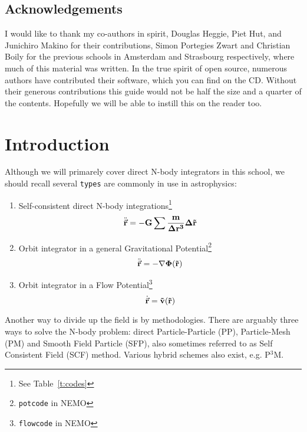 \section*{Acknowledgements}

I would like to thank my co-authors in spirit, 
Douglas Heggie, Piet Hut, and Junichiro Makino for their contributions, 
Simon Portegies Zwart and Christian Boily for the previous schools in Amsterdam 
and Strasbourg respectively, where much of this material was written.
In the true spirit of open source, 
numerous authors have contributed their software, which you can find on
the CD. Without their generous contributions this guide would not be
half the size and a quarter of the contents.
Hopefully we will be able to instill this on the reader too.



\chapter                {Introduction}

Although we will primarely cover direct N-body integrators in this school,
we should recall several {\tt types} are commonly in use
in astrophysics:

\begin{enumerate}
\item
Self-consistent direct N-body integrations\footnote{See Table~\ref{t:codes}}
\begin{equation}
    \ddot{\vec{\bf r}} = -G \sum{ {m\over{\Delta r^3}} \Delta \vec{\bf r}}
\end{equation}

\item
Orbit integrator in a general Gravitational Potential\footnote{{\tt potcode} in NEMO}
\begin{equation}
    \ddot{\vec{\bf r}} = -\nabla \Phi(\vec{\bf r})
\end{equation}

\item
Orbit integrator in a Flow Potential\footnote{{\tt flowcode} in NEMO}
\begin{equation}
    \dot{\vec{\bf r}} = \vec{\bf v}(\vec{\bf r})
\end{equation}


\end{enumerate}

Another way to divide up the field is by methodologies. There are arguably
three ways to solve the N-body problem: direct Particle-Particle (PP),
Particle-Mesh (PM) and Smooth Field Particle (SFP), also sometimes 
referred to as Self Consistent Field (SCF) method. Various hybrid schemes
also exist, e.g. P$^3$M.

